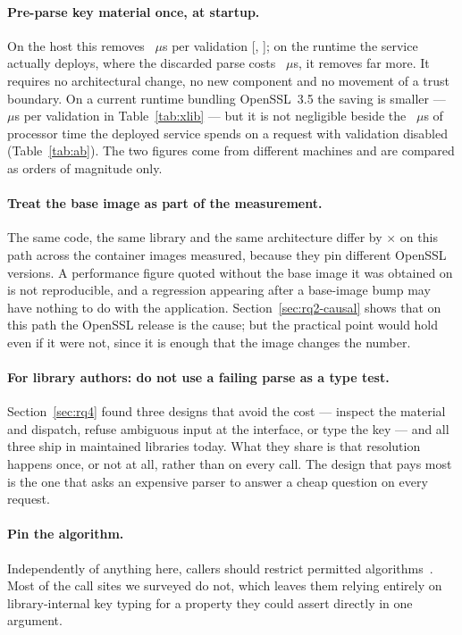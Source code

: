 \documentclass[pdflatex,sn-basic,twocolumn]{sn-jnl}%
\begin{document}
\paragraph{Pre-parse key material once, at startup.} On the host this removes
\HostStringPenalty~$\mu$s per validation
[\HostStringPenaltyCiLo, \HostStringPenaltyCiHi]; on the runtime the service
actually deploys, where the discarded parse costs
\NodeEighteenProbeThrows~$\mu$s, it removes far more. It requires no
architectural change, no new component and no movement of a trust boundary.
On a current runtime bundling OpenSSL~3.5 the saving is smaller ---
\XlibJsonwebtokenNewSslPenalty~$\mu$s per validation in Table~\ref{tab:xlib} ---
but it is not negligible beside the \AbCpuPerCallNone~$\mu$s of processor time
the deployed service spends on a request with validation disabled
(Table~\ref{tab:ab}). The two figures come from different machines and are
compared as orders of magnitude only.

\paragraph{Treat the base image as part of the measurement.} The same code, the
same library and the same architecture differ by \SpanProbeThrows$\times$ on this
path across the container images measured, because they pin different OpenSSL
versions. A performance figure quoted without the base image it was obtained on
is not reproducible, and a regression appearing after a base-image bump may have
nothing to do with the application. Section~\ref{sec:rq2-causal} shows that on
this path the OpenSSL release is the cause; but the practical point would hold
even if it were not, since it is enough that the image changes the number.

\paragraph{For library authors: do not use a failing parse as a type test.}
Section~\ref{sec:rq4} found three designs that avoid the cost --- inspect the
material and dispatch, refuse ambiguous input at the interface, or type the
key --- and all three ship in maintained libraries today. What they share is
that resolution happens once, or not at all, rather than on every call. The
design that pays most is the one that asks an expensive parser to answer a cheap
question on every request.

\paragraph{Pin the algorithm.} Independently of anything here, callers should
restrict permitted algorithms~\citep{rfc8725}. Most of the call sites we surveyed
do not, which leaves them relying entirely on library-internal key typing for a
property they could assert directly in one argument.
\end{document}
